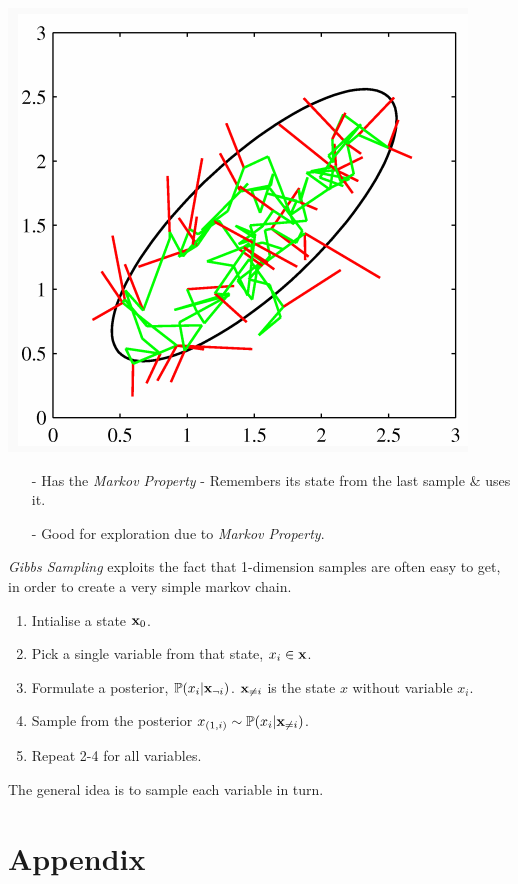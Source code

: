 \documentclass[11pt,a4paper]{article}
\begin{document}
\includegraphics[scale=.4]{img/mcmc.png}

\begin{itemize}
	\item[-] Has the \textit{Markov Property} - Remembers its state from the last sample \& uses it.
	\item[-] Good for exploration due to \textit{Markov Property}.
\end{itemize}

\textit{Gibbs Sampling} exploits the fact that 1-dimension samples are often easy to get, in order to create a very simple markov chain.\\
\begin{enumerate}
	\item Intialise a state $\textbf{x}_0$.
	\item Pick a single variable from that state, $x_i\in\textbf{x}$.
	\item Formulate a posterior, $\mathbb{P}(x_i|\textbf{x}_{\neg i})$. $\textbf{x}_{\neq i}$ is the state $x$ without variable $x_i$.
	\item Sample from the posterior
	$x_{(1,i)}\sim\mathbb{P}(x_i|\textbf{x}_{\neq i})$.
	\item Repeat 2-4 for all variables.
\end{enumerate}
\nb The general idea is to sample each variable in turn.

\newpage
\setcounter{section}{-1}
\section{Appendix}
\end{document}
